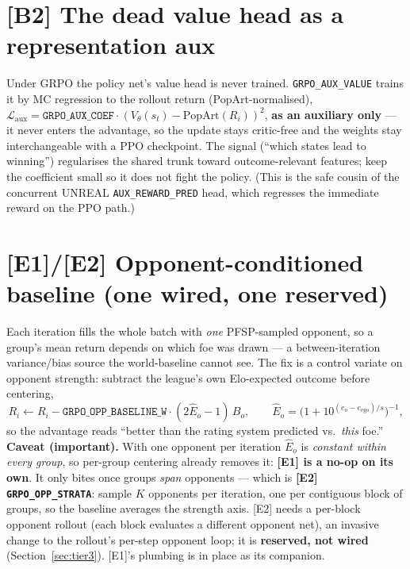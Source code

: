 \documentclass[11pt]{article}
\newcommand{\cd}[1]{\texttt{#1}}
\begin{document}
\section{[B2] The dead value head as a representation aux}\label{sec:aux}
Under GRPO the policy net's value head is never trained. \cd{GRPO\_AUX\_VALUE} trains it by MC regression to
the rollout return (PopArt-normalised), $\mathcal
L_{\mathrm{aux}}=\cd{GRPO\_AUX\_COEF}\cdot(V_\theta(s_t)-\text{PopArt}(R_i))^2$, \textbf{as an auxiliary
only} --- it never enters the advantage, so the update stays critic-free and the weights stay
interchangeable with a PPO checkpoint. The signal (``which states lead to winning'') regularises the shared
trunk toward outcome-relevant features; keep the coefficient small so it does not fight the policy. (This is
the safe cousin of the concurrent UNREAL \cd{AUX\_REWARD\_PRED} head, which regresses the immediate reward on
the PPO path.)

\section{[E1]/[E2] Opponent-conditioned baseline (one wired, one reserved)}\label{sec:opp}
Each iteration fills the whole batch with \emph{one} PFSP-sampled opponent, so a group's mean return depends
on which foe was drawn --- a between-iteration variance/bias source the world-baseline cannot see. The fix is
a control variate on opponent strength: subtract the league's own Elo-expected outcome before centering,
\begin{equation}
R_i\leftarrow R_i-\cd{GRPO\_OPP\_BASELINE\_W}\cdot(2\hat E_o-1)\,B_o,\qquad \hat E_o=\big(1+10^{(e_o-e_{\text{ego}})/s}\big)^{-1},
\end{equation}
so the advantage reads ``better than the rating system predicted vs.\ \emph{this} foe.'' \textbf{Caveat
(important).} With one opponent per iteration $\hat E_o$ is \emph{constant within every group}, so per-group
centering already removes it: \textbf{[E1] is a no-op on its own}. It only bites once groups \emph{span}
opponents --- which is \textbf{[E2] \cd{GRPO\_OPP\_STRATA}}: sample $K$ opponents per iteration, one per
contiguous block of groups, so the baseline averages the strength axis. [E2] needs a per-block opponent
rollout (each block evaluates a different opponent net), an invasive change to the rollout's per-step
opponent loop; it is \textbf{reserved, not wired} (Section~\ref{sec:tier3}). [E1]'s plumbing is in place as
its companion.
\end{document}
